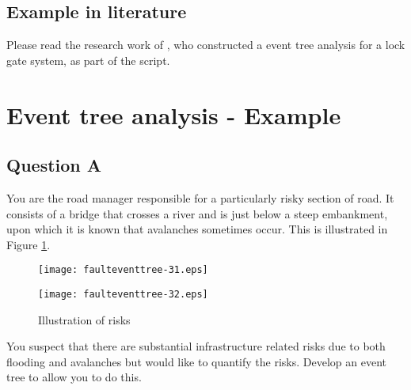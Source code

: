 \subsection{Example in literature}
Please read the research work of \cite{Beim1997}, who constructed a event
tree analysis for a lock gate system, as part of the script.
\section{Event tree analysis - Example}
\subsection{Question A}
You are the road manager responsible for a particularly risky section of road.
It consists of a bridge that crosses a river and is just below a steep
embankment, upon which it is known that avalanches sometimes occur. This is
illustrated in Figure \ref{figfaultevent2x}.
%
\begin{figure}
 \begin{minipage}[h]{0.5\linewidth}
        \centering
        \texttt{[image: faulteventtree-31.eps]}
				\label{faulteventtree-31}
     \end{minipage}
\vspace{3.00mm}
    \begin{minipage}[h]{0.5\linewidth}
       \centering
       \texttt{[image: faulteventtree-32.eps]}
			\label{faulteventtree-32}
     \end{minipage}
\caption{Illustration of risks}
\label{figfaultevent2x}
\end{figure}
%
You suspect that there are substantial infrastructure related risks due to both
flooding and avalanches but would like to quantify the risks. Develop an event
tree to allow you to do this.
